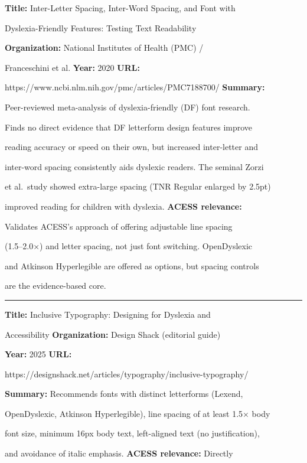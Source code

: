 \documentclass[12pt, oneside]{article} %
\begin{document}
\textbf{Title:} Inter-Letter Spacing, Inter-Word Spacing, and Font with

Dyslexia-Friendly Features: Testing Text Readability

\textbf{Organization:} National Institutes of Health (PMC) /

Franceschini et al. \textbf{Year:} 2020 \textbf{URL:}

https://www.ncbi.nlm.nih.gov/pmc/articles/PMC7188700/ \textbf{Summary:}

Peer-reviewed meta-analysis of dyslexia-friendly (DF) font research.

Finds no direct evidence that DF letterform design features improve

reading accuracy or speed on their own, but increased inter-letter and

inter-word spacing consistently aids dyslexic readers. The seminal Zorzi

et al.~study showed extra-large spacing (TNR Regular enlarged by 2.5pt)

improved reading for children with dyslexia. \textbf{ACESS relevance:}

Validates ACESS's approach of offering adjustable line spacing

(1.5--2.0×) and letter spacing, not just font switching. OpenDyslexic

and Atkinson Hyperlegible are offered as options, but spacing controls

are the evidence-based core.



\begin{center}\rule{0.5\linewidth}{0.5pt}\end{center}



\textbf{Title:} Inclusive Typography: Designing for Dyslexia and

Accessibility \textbf{Organization:} Design Shack (editorial guide)

\textbf{Year:} 2025 \textbf{URL:}

https://designshack.net/articles/typography/inclusive-typography/

\textbf{Summary:} Recommends fonts with distinct letterforms (Lexend,

OpenDyslexic, Atkinson Hyperlegible), line spacing of at least 1.5× body

font size, minimum 16px body text, left-aligned text (no justification),

and avoidance of italic emphasis. \textbf{ACESS relevance:} Directly
\end{document}
